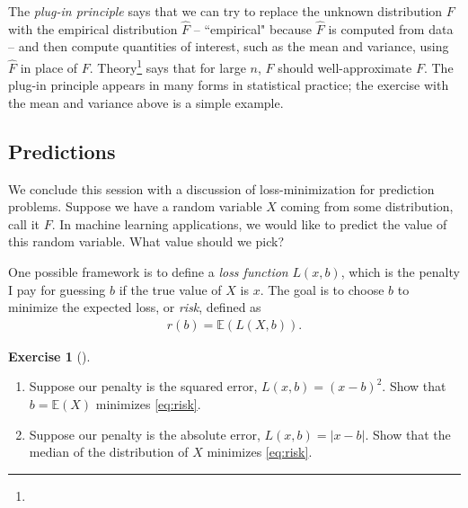 \documentclass[11pt]{article}
\theoremstyle{definition}
\newtheorem{exercise}[]{Exercise}
\newcommand{\E}{\mathbb{E}}
\begin{document}
The \textit{plug-in principle} says that we can try to replace the unknown
distribution $F$ with the empirical distribution $\hat F$ -- ``empirical" because
$\hat F$ is computed from data -- and then compute quantities of interest,
such as the mean and variance,
using $\hat F$ in place of $F$.
Theory\footnote{} says that for large $n$, $\hat F$ should well-approximate $F$.
The plug-in principle
appears in many forms in statistical practice; the exercise with the mean and variance above
is a simple example.

\subsection{Predictions}

We conclude this session with a discussion of loss-minimization for prediction problems.
Suppose we have a random variable $X$ coming from some distribution, call it $F$.
In machine learning applications, we would like to predict the value of this random variable.
What value should we pick?

One possible framework is to define a \textit{loss function} $L(x, b)$, which is
the penalty I pay for guessing $b$ if the true value of $X$ is $x$.
The goal is to choose $b$ to minimize the expected loss, or \textit{risk}, defined as
\begin{align}
  r(b) = \E(L(X, b)).
  \label{eq:risk}
\end{align}

\begin{exercise}[]
  $\quad$\vspace{-1em}

  \begin{enumerate}[label = (\alph*)]
    \item Suppose our penalty is the squared error, $L(x, b) = (x - b)^2$. Show that $b = \E(X)$ minimizes
    \eqref{eq:risk}.
    \item Suppose our penalty is the absolute error, $L(x, b) = |x - b|$. Show that the median of the
    distribution of $X$ minimizes \eqref{eq:risk}.
  \end{enumerate}
\end{exercise}
\end{document}
